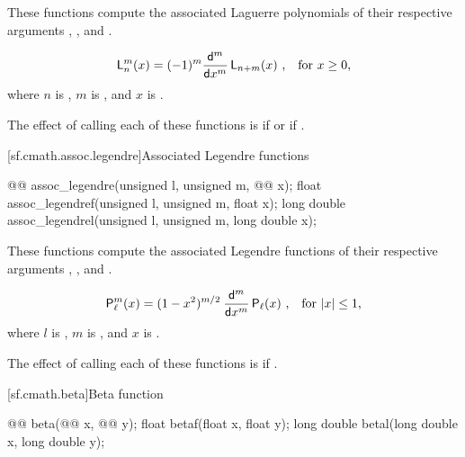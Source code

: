 \begin{itemdescr}
\pnum
\effects
These functions compute
the associated Laguerre polynomials
of their respective arguments
, , and .

\pnum
\returns
\[ \mathsf{L}_n^m(x) =
   (-1)^m \frac{\mathsf{d} ^ m}{\mathsf{d}x ^ m} \, \mathsf{L}_{n+m}(x)
   \text{ ,\quad for $x \ge 0$,} \]
where
$n$ is ,
$m$ is , and
$x$ is .

\pnum
\remarks
The effect of calling each of these functions
is 
if  or if .
\end{itemdescr}

[sf.cmath.assoc.legendre]{Associated Legendre functions}%
%
%
%
%
%
\begin{itemdecl}
@@ assoc_legendre(unsigned l, unsigned m, @@ x);
float        assoc_legendref(unsigned l, unsigned m, float x);
long double  assoc_legendrel(unsigned l, unsigned m, long double x);
\end{itemdecl}

\begin{itemdescr}

\pnum
\effects
These functions compute
the associated Legendre functions
of their respective arguments
, , and .

\pnum
\returns
\[ \mathsf{P}_\ell^m(x) = (1 - x^2) ^ {m/2} \:
   \frac{\mathsf{d} ^ m}{\mathsf{d}x ^ m} \, \mathsf{P}_\ell(x)
   \text{ ,\quad for $|x| \le 1$,} \]
where
$l$ is ,
$m$ is , and
$x$ is .

\pnum
\remarks
The effect of calling each of these functions
is 
if .
\end{itemdescr}

[sf.cmath.beta]{Beta function}%
%
%
%
%
%
\begin{itemdecl}
@@ beta(@@ x, @@ y);
float        betaf(float x, float y);
long double  betal(long double x, long double y);
\end{itemdecl}

